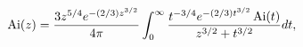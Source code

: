 \[\mathop{\mathrm{Ai}\/}\nolimits\!\left(z\right)=\frac{3z^{5/4}e^{-(2/3)z^{3/2}%
}}{4\pi}\*\int_{0}^{\infty}\frac{t^{-3/4}e^{-(2/3)t^{3/2}}\mathop{\mathrm{Ai}%
\/}\nolimits\!\left(t\right)}{z^{3/2}+t^{3/2}}dt,\]